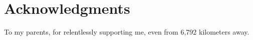 \chapter*{Acknowledgments}

To my parents, for relentlessly supporting me, even from 6,792 kilometers away.

